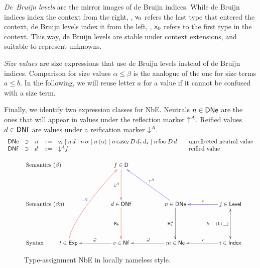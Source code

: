 \documentclass[acmlarge,review,anonymous]{acmart}\settopmatter{printfolios=true}
\begin{document}
\emph{De~Bruijn levels} are the mirror images of de Bruijn indices.  While de Bruijn
indices index the context from the right, \ie, $\mathsf{v}_{0}$ refers the
last type that entered the context, de Bruijn levels index it from the
left, \ie, $\mathsf{x}_{0}$ refers to the first type in the context.  This
way, de Bruijn levels are stable under context extensions, and
suitable to represent unknowns.

\emph{Size values} \fbox{$\alpha, \beta \in \SIZE$} are size
expressions that use de Bruijn levels instead of de Bruijn
indices. Comparison for size values $\alpha \leq \beta$ is the
analogue of the one for size terms $a \leq b$.  In the following, we
will reuse letter $a$ for a value if it cannot be confused with a size
term.

Finally, we identify two expression classes for NbE. Neutrals
$n \in \mathsf{DNe}$ are the ones that will appear in values under the
reflection marker $\mathord{\uparrow^{A}}$.  Reified values $d \in \mathsf{DNf}$ are values
under a reification marker $\mathord{\downarrow^{A}}$.
\[
\begin{array}{lllll@{\qquad}l}
  \DNe & \ni &
  n & ::= & \ind i \mid n\,d \mid n\,\alpha \mid n\,\ann \alpha \mid
            n\,\case[\ell] D{d_z}{d_s} \mid n\,\fix[\ell] D d
    & \mbox{unreflected neutral value} \\
  \DNf & \ni &
  d & ::= & \down A f
    & \mbox{reified value} \\
\end{array}
\]

\begin{figure}
$$
\xymatrix@R=12ex@C=12ex{
\mathrlap{\mbox{Semantics ($\beta$)}} &
  &                f \in \D   \ar@[red][d]_{\down A}
\\
\mathrlap{\mbox{Semantics ($\beta\eta$)}} &
  &                d \in \DNf \ar@[red][d]_{\tR_k{}}
  &                n \in \DNe \ar[d]_{\tRne_k} \ar@[blue][ul]_{\up A}
  & \ar@[blue][l]_{\var{}} j \in \Level \ar@{<->}[d]_{k\dotminus(1+\_)}
\\
\mathrlap{\mbox{Syntax}} &
t \in \Exp \ar@[red]@(u,dl)[uur]^{\_\color{blue}\eta} %
  & \ar[l]_{\supseteq}  v \in \Nf
  & \ar[l]_{\supseteq}  m \in \Ne
  & \ar[l]_{\ind{}}     i \in \Index
  &
}
$$
\caption{Type-assignment NbE in locally nameless
    style.\label{fig:typedchart}}
\end{figure}
\end{document}
